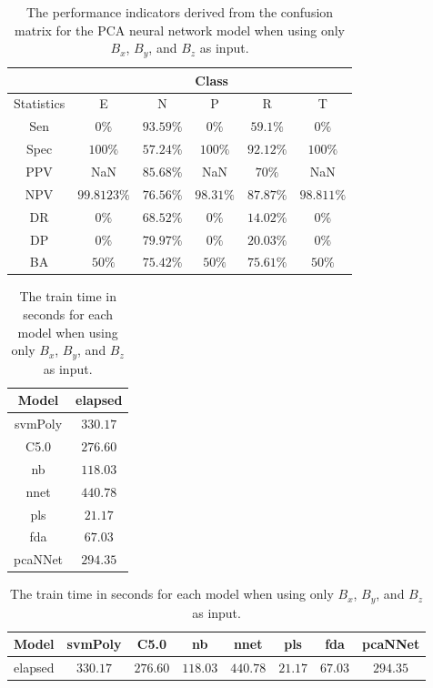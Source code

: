 \begin{table}[!ht]
	\centering
	\begin{tabular}{|c|c|c|c|c|c|}
		\hline
		 & \multicolumn{5}{c|}{Class} \\ \hline
		Statistics & E & N & P & R & T \\ \hline
		Sen & $0\%$ & $93.59\%$ & $0\%$ & $59.1\%$ & $0\%$ \\ \hline
		Spec & $100\%$ & $57.24\%$ & $100\%$ & $92.12\%$ & $100\%$ \\ \hline
		PPV & NaN & $85.68\%$ & NaN & $70\%$ & NaN \\ \hline
		NPV & $99.8123\%$ & $76.56\%$ & $98.31\%$ & $87.87\%$ & $98.811\%$ \\ \hline
		DR & $0\%$ & $68.52\%$ & $0\%$ & $14.02\%$ & $0\%$ \\ \hline
		DP & $0\%$ & $79.97\%$ & $0\%$ & $20.03\%$ & $0\%$ \\ \hline
		BA & $50\%$ & $75.42\%$ & $50\%$ & $75.61\%$ & $50\%$ \\ \hline
	\end{tabular}
	\caption{The performance indicators derived from the confusion matrix for the PCA neural network model when using only $B_{x}$, $B_{y}$, and $B_{z}$ as input.}
	\label{tab:cs:reverse:coord:pcaNNet}
\end{table}

\begin{table}[!ht]
	\centering
	\begin{tabular}{|c|c|}
		\hline
		Model & elapsed \\ \hline
		svmPoly & $330.17$ \\ \hline
		C5.0 & $276.60$ \\ \hline
		nb & $118.03$ \\ \hline
		nnet & $440.78$ \\ \hline
		pls & $21.17$ \\ \hline
		fda & $67.03$ \\ \hline
		pcaNNet & $294.35$ \\ \hline
	\end{tabular}
	\caption{The train time in seconds for each model when using only $B_{x}$, $B_{y}$, and $B_{z}$ as input.}
	\label{tab:time:coord:train}
\end{table}

\begin{table}[!ht]
	\centering
	\begin{tabular}{|c|c|c|c|c|c|c|c|}
		\hline
		Model & svmPoly & C5.0 & nb & nnet & pls & fda & pcaNNet \\ \hline
		elapsed & $330.17$ & $276.60$ & $118.03$ & $440.78$ & $21.17$ & $67.03$ & $294.35$ \\ \hline
	\end{tabular}
	\caption{The train time in seconds for each model when using only $B_{x}$, $B_{y}$, and $B_{z}$ as input.}
	\label{tab:time:reverse:coord:train}
\end{table}

